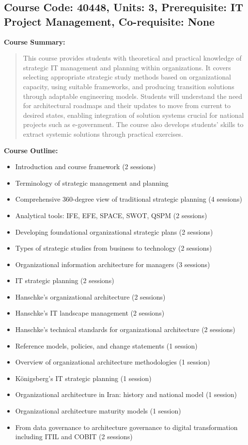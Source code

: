 \documentclass[12pt]{article}
\begin{document}
\subsection*{Course Code: 40448, Units: 3, Prerequisite: IT Project Management, Co-requisite: None}

\textbf{Course Summary:} 
\begin{quote}
This course provides students with theoretical and practical knowledge of strategic IT management and planning within organizations. It covers selecting appropriate strategic study methods based on organizational capacity, using suitable frameworks, and producing transition solutions through adaptable engineering models. Students will understand the need for architectural roadmaps and their updates to move from current to desired states, enabling integration of solution systems crucial for national projects such as e-government. The course also develops students' skills to extract systemic solutions through practical exercises.
\end{quote}

\textbf{Course Outline:}
\begin{itemize}
    \item Introduction and course framework (2 sessions)
    \item Terminology of strategic management and planning
    \item Comprehensive 360-degree view of traditional strategic planning (4 sessions)
    \item Analytical tools: IFE, EFE, SPACE, SWOT, QSPM (2 sessions)
    \item Developing foundational organizational strategic plans (2 sessions)
    \item Types of strategic studies from business to technology (2 sessions)
    \item Organizational information architecture for managers (3 sessions)
    \item IT strategic planning (2 sessions)
    \item Hanschke’s organizational architecture (2 sessions)
    \item Hanschke’s IT landscape management (2 sessions)
    \item Hanschke’s technical standards for organizational architecture (2 sessions)
    \item Reference models, policies, and change statements (1 session)
    \item Overview of organizational architecture methodologies (1 session)
    \item Königsberg’s IT strategic planning (1 session)
    \item Organizational architecture in Iran: history and national model (1 session)
    \item Organizational architecture maturity models (1 session)
    \item From data governance to architecture governance to digital transformation including ITIL and COBIT (2 sessions)
\end{itemize}
\end{document}
